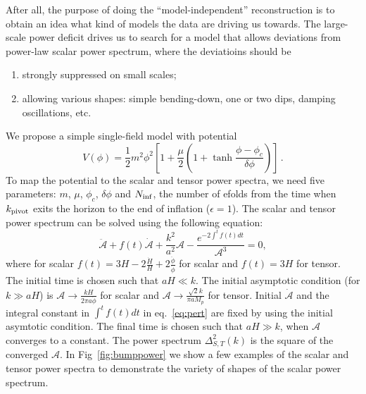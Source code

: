 \documentclass[11pt]{article}
\begin{document}
After all, the purpose of doing the ``model-independent'' reconstruction is to obtain an idea what kind of models the data are driving us towards. The large-scale power deficit drives us to search for a model that allows deviations from power-law scalar power spectrum, where the deviatioins should be
\begin{enumerate}
\item{strongly suppressed on small scales;}
\item{allowing various shapes: simple bending-down, one or two dips, damping oscillations, etc.}
\end{enumerate}
We propose a simple single-field model with potential
\begin{equation}
V(\phi) = \frac{1}{2}m^2\phi^2\left[1 + \frac{\mu}{2} (1 + \tanh{\frac{\phi - \phi_c}{\delta\phi}}) \right] \,. \label{eq:pot}
\end{equation}
To map the potential to the scalar and tensor power spectra, we need five parameters: $m$, $\mu$, $\phi_c$, $\delta\phi$ and $N_{\rm inf}$, the number of efolds from the time when $k_{\rm pivot}$ exits the horizon to the end of inflation ($\epsilon = 1$). The scalar and tensor power spectrum can be solved using the following equation:
\begin{equation}
  \ddot{\mathcal{A}} + f(t) \dot{\mathcal{A}} + \frac{k^2}{a^2} \mathcal{A} - \frac{e^{-2\int^t f(t) dt}}{\mathcal{A}^3}  = 0, \label{eq:pert}
\end{equation}
where for scalar $f(t) = 3 H - 2 \frac{\dot H}{H} + 2 \frac{\ddot\phi}{\dot\phi}$ for scalar and $f(t) = 3H$ for tensor. The initial time is chosen such that $aH\ll k$. The initial asymptotic condition (for $k\gg aH$) is $\mathcal{A} \rightarrow \frac{k H }{2\pi a\dot\phi}$ for scalar and $\mathcal{A} \rightarrow \frac{\sqrt{2}k}{\pi a M_p}$ for tensor.  Initial $\dot{\mathcal{A}}$ and the integral constant in $\int^t f(t) dt$ in eq.~\eqref{eq:pert} are fixed by using the initial asymtotic condition.  The final time is chosen such that $aH\gg k$, when $\mathcal{A}$ converges to a constant.  The power spectrum $\Delta^2_{S,T}(k)$ is the square of the converged $\mathcal{A}$. In Fig~\ref{fig:bumppower} we show a few examples of the scalar and tensor power spectra to demonstrate the variety of shapes of the scalar power spectrum. 
\end{document}
